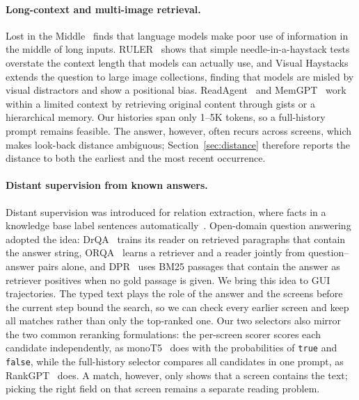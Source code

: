 \paragraph{Long-context and multi-image retrieval.} Lost in the Middle~\citep{lost} finds that language models make poor use of information in the middle of long inputs. RULER~\citep{ruler} shows that simple needle-in-a-haystack tests overstate the context length that models can actually use, and Visual Haystacks~\citep{haystacks} extends the question to large image collections, finding that models are misled by visual distractors and show a positional bias. ReadAgent~\citep{readagent} and MemGPT~\citep{memgpt} work within a limited context by retrieving original content through gists or a hierarchical memory. Our histories span only 1--5K tokens, so a full-history prompt remains feasible. The answer, however, often recurs across screens, which makes look-back distance ambiguous; Section~\ref{sec:distance} therefore reports the distance to both the earliest and the most recent occurrence.

\paragraph{Distant supervision from known answers.} Distant supervision was introduced for relation extraction, where facts in a knowledge base label sentences automatically~\citep{mintz}. Open-domain question answering adopted the idea: DrQA~\citep{drqa} trains its reader on retrieved paragraphs that contain the answer string, ORQA~\citep{orqa} learns a retriever and a reader jointly from question--answer pairs alone, and DPR~\citep{dpr} uses BM25 passages that contain the answer as retriever positives when no gold passage is given. We bring this idea to GUI trajectories. The typed text plays the role of the answer and the screens before the current step bound the search, so we can check every earlier screen and keep all matches rather than only the top-ranked one. Our two selectors also mirror the two common reranking formulations: the per-screen scorer scores each candidate independently, as monoT5~\citep{monot5} does with the probabilities of \texttt{true} and \texttt{false}, while the full-history selector compares all candidates in one prompt, as RankGPT~\citep{rankgpt} does. A match, however, only shows that a screen contains the text; picking the right field on that screen remains a separate reading problem.

